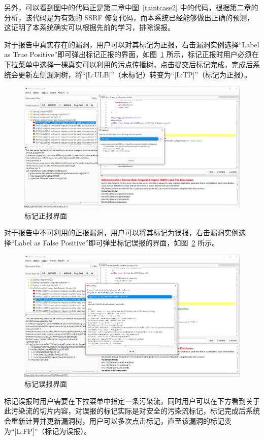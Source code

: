 另外，可以看到图中的代码正是第二章中图~\ref{taintcase2} 中的代码，根据第二章的分析，该代码是为有效的 SSRF 修复代码，而本系统已经能够做出正确的预测，这证明了本系统确实可以根据先前的学习，排除误报。

对于报告中真实存在的漏洞，用户可以对其标记为正报，右击漏洞实例选择“Label as True Positive”即可弹出标记正报的界面，如图~\ref{show:labelTP} 所示，标记正报时用户必须在下拉菜单中选择一棵真实可以利用的污点传播树，点击提交后标记完成，完成后系统会更新左侧漏洞树，将“[L:ULB]”（未标记）转变为“[L:TP]”（标记为正报）。

\begin{figure}[H]
    \centering
    \includegraphics[width=0.8\linewidth]{FIGs/chapter4/labelTP.png}
    \caption{标记正报界面}\label{show:labelTP}
\end{figure}

对于报告中不可利用的正报漏洞，用户可以将其标记为误报，右击漏洞实例选择“Label as False Positive”即可弹出标记误报的界面，如图~\ref{show:labelFP} 所示。

\begin{figure}[H]
    \centering
    \includegraphics[width=0.8\linewidth]{FIGs/chapter4/labelFP.png}
    \caption{标记误报界面}\label{show:labelFP}
\end{figure}


标记误报时用户需要在下拉菜单中指定一条污染流，同时用户可以在下方看到关于此污染流的切片内容，对误报的标记实际是对安全的污染流标记，标记完成后系统会重新计算并更新漏洞树，用户可以多次点击标记，直至该漏洞的标记变为“[L:FP]”（标记为误报）。




